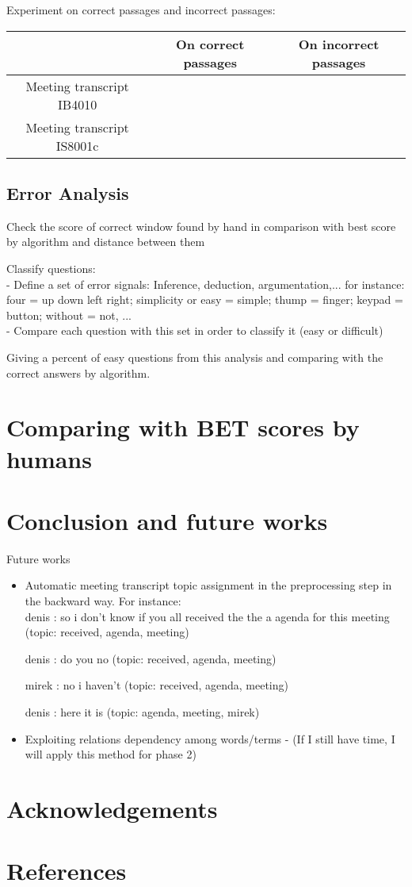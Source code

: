 \documentclass[10pt,a4paper]{article}
\begin{document}
Experiment on correct passages and incorrect passages:

\begin{tabular}{|c|c|c|}
\hline  & On correct passages & On incorrect passages \\ 
\hline Meeting transcript IB4010 &  &  \\ 
\hline Meeting transcript IS8001c &  &  \\ 
\hline 
\end{tabular} 

\subsection{Error Analysis}
\begin{list}{}{}
\item {Check the score of correct window found by hand in comparison with best score by algorithm and distance between them}
\item {Classify questions: \\
		- Define a set of error signals: Inference, deduction, argumentation,... for instance: four = up down left right; simplicity or easy = simple; thump = finger; keypad = button; without = not, ... \\
		- Compare each question with this set in order to classify it (easy or difficult) }
\end{list}

Giving a percent of easy questions from this analysis and comparing with the correct answers by algorithm.

\section{Comparing with BET scores by humans}

\section{Conclusion and future works}

Future works
\begin{itemize}
\item{Automatic meeting transcript topic assignment in the preprocessing step in the backward way. For instance: \\
		denis : so i don't know if you all received the the a agenda for this meeting (topic: received, agenda, meeting)

		denis : do you no (topic: received, agenda, meeting)

		mirek : no i haven't (topic: received, agenda, meeting)

		denis : here it is (topic: agenda, meeting, mirek)}
\item{Exploiting relations dependency among words/terms - (If I still have time, I will apply this method for phase 2)}

\end{itemize}
\section{Acknowledgements}

\section{References}
\end{document}
